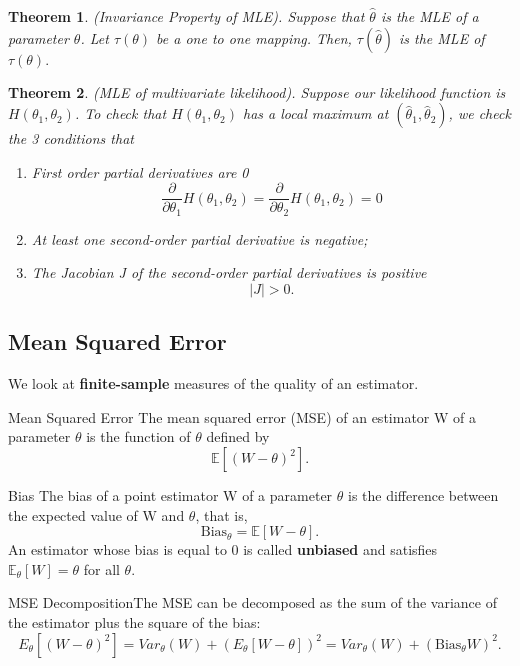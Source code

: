 \documentclass[twoside]{article}
\newcounter{lecnum}
\newtheorem{theorem}{Theorem}[lecnum]
\begin{document}
\begin{theorem}(Invariance Property of MLE). Suppose that $\hat{\theta}$ is the MLE of a parameter $\theta$. Let $\tau(\theta)$ be a one to one mapping. Then, $\tau(\hat{\theta})$ is the MLE of $\tau(\theta).$
\end{theorem}

\begin{theorem}(MLE of multivariate likelihood). Suppose our likelihood function is $H(\theta_1, \theta_2)$. To check that $H(\theta_1,\theta_2)$ has a local maximum at $(\hat{\theta}_1,\hat{\theta}_2)$, we check the 3 conditions that 
\begin{enumerate}
\item First order partial derivatives are 0 
$$
\frac{\partial}{\partial \theta_1}H(\theta_1, \theta_2) = \frac{\partial}{\partial \theta_2}H(\theta_1, \theta_2) = 0
$$
\item At least one second-order partial derivative is negative;
\item The Jacobian J of the second-order partial derivatives is positive 
$$
|J| > 0.
$$
\end{enumerate}
\end{theorem}

\subsection{Mean Squared Error}
We look at \textbf{finite-sample} measures of the quality of an estimator.
\begin{definition_exam}{Mean Squared Error}{} The mean squared error (MSE) of an estimator W of a parameter $\theta$ is the function of $\theta$ defined by 
$$
\mathbb{E}[(W - \theta)^2].
$$
\end{definition_exam}

\begin{definition_exam}{Bias}{} The bias of a point estimator W of a parameter $\theta$ is the difference between the expected value of W and $\theta$, that is, 
$$
\text{Bias}_{\theta} = \mathbb{E}[W - \theta].
$$
An estimator whose bias is equal to 0 is called \textbf{unbiased} and satisfies $\mathbb{E}_{\theta}[W] = \theta$ for all $\theta$.
\end{definition_exam}

\begin{theorem_exam}{MSE Decomposition}{}The MSE can be decomposed as the sum of the variance of the estimator plus the square of the bias: 
$$
E_{\theta}[(W - \theta)^2] = Var_{\theta}(W) + (E_{\theta}[W - \theta])^2 = Var_{\theta}(W) + (\text{Bias}_{\theta}W)^2.
$$
\end{theorem_exam}
\end{document}
